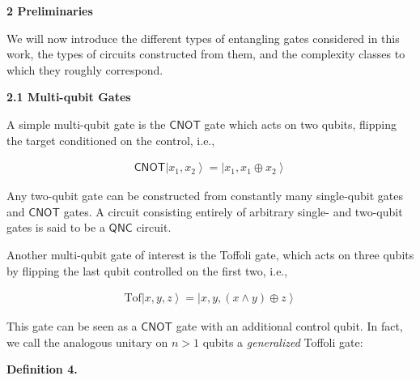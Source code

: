 \par\medskip\noindent\textbf{
2 Preliminaries}\par




We will now introduce the different types of entangling gates considered in this work, the types of circuits constructed from them, and the complexity classes to which they roughly correspond.\par




\par\medskip\noindent\textbf{
2.1 Multi-qubit Gates}\par




A simple multi-qubit gate is the $\mathsf{CNOT}$ gate which acts on two qubits, flipping the target conditioned on the control, i.e.,\par


\[\begin{gathered}
\displaystyle\mathsf{CNOT}\left|x_{1},x_{2}\right\rangle=\left|x_{1},x_{1}\oplus x_{2}\right\rangle
\end{gathered}\]


Any two-qubit gate can be constructed from constantly many single-qubit gates and $\mathsf{CNOT}$ gates. A circuit consisting entirely of arbitrary single- and two-qubit gates is said to be a ${\mathsf{QNC}}$ circuit.\par




Another multi-qubit gate of interest is the Toffoli gate, which acts on three qubits by flipping the last qubit controlled on the first two, i.e.,\par


\[\begin{gathered}
\displaystyle\text{Tof}\left|x,y,z\right\rangle=\left|x,y,(x\land y)\oplus z\right\rangle
\end{gathered}\]


This gate can be seen as a $\mathsf{CNOT}$ gate with an additional control qubit. In fact, we call the analogous unitary on $n>1$ qubits a \emph{generalized} Toffoli gate:\par





\par\medskip\noindent\textbf{
\textbf{Definition 4}\textbf{.}
}\par



